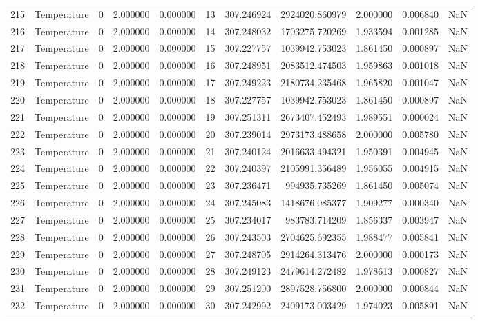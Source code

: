 \begin{tabular}{llrrrrrrrrr}
215 & Temperature & 0 & 2.000000 & 0.000000 & 13 & 307.246924 & 2924020.860979 & 2.000000 & 0.006840 & NaN \\
216 & Temperature & 0 & 2.000000 & 0.000000 & 14 & 307.248032 & 1703275.720269 & 1.933594 & 0.001285 & NaN \\
217 & Temperature & 0 & 2.000000 & 0.000000 & 15 & 307.227757 & 1039942.753023 & 1.861450 & 0.000897 & NaN \\
218 & Temperature & 0 & 2.000000 & 0.000000 & 16 & 307.248951 & 2083512.474503 & 1.959863 & 0.001018 & NaN \\
219 & Temperature & 0 & 2.000000 & 0.000000 & 17 & 307.249223 & 2180734.235468 & 1.965820 & 0.001047 & NaN \\
220 & Temperature & 0 & 2.000000 & 0.000000 & 18 & 307.227757 & 1039942.753023 & 1.861450 & 0.000897 & NaN \\
221 & Temperature & 0 & 2.000000 & 0.000000 & 19 & 307.251311 & 2673407.452493 & 1.989551 & 0.000024 & NaN \\
222 & Temperature & 0 & 2.000000 & 0.000000 & 20 & 307.239014 & 2973173.488658 & 2.000000 & 0.005780 & NaN \\
223 & Temperature & 0 & 2.000000 & 0.000000 & 21 & 307.240124 & 2016633.494321 & 1.950391 & 0.004945 & NaN \\
224 & Temperature & 0 & 2.000000 & 0.000000 & 22 & 307.240397 & 2105991.356489 & 1.956055 & 0.004915 & NaN \\
225 & Temperature & 0 & 2.000000 & 0.000000 & 23 & 307.236471 & 994935.735269 & 1.861450 & 0.005074 & NaN \\
226 & Temperature & 0 & 2.000000 & 0.000000 & 24 & 307.245083 & 1418676.085377 & 1.909277 & 0.000340 & NaN \\
227 & Temperature & 0 & 2.000000 & 0.000000 & 25 & 307.234017 & 983783.714209 & 1.856337 & 0.003947 & NaN \\
228 & Temperature & 0 & 2.000000 & 0.000000 & 26 & 307.243503 & 2704625.692355 & 1.988477 & 0.005841 & NaN \\
229 & Temperature & 0 & 2.000000 & 0.000000 & 27 & 307.248705 & 2914264.313476 & 2.000000 & 0.000173 & NaN \\
230 & Temperature & 0 & 2.000000 & 0.000000 & 28 & 307.249123 & 2479614.272482 & 1.978613 & 0.000827 & NaN \\
231 & Temperature & 0 & 2.000000 & 0.000000 & 29 & 307.251200 & 2897528.756800 & 2.000000 & 0.000844 & NaN \\
232 & Temperature & 0 & 2.000000 & 0.000000 & 30 & 307.242992 & 2409173.003429 & 1.974023 & 0.005891 & NaN \\

\end{tabular}
